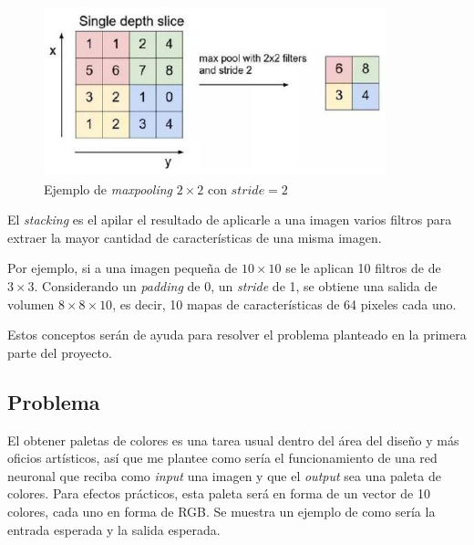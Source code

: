 \documentclass[14pt,a4paper]{report}
\begin{document}
\begin{figure}[h]
  \centering
\includegraphics[scale=1]{../maxpooling.png} 
  \caption{Ejemplo de \textit{maxpooling} $2\times2$ con $\textit{stride}=2$}
  \label{fig:neural-network}
\end{figure}

El \textit{stacking} es el apilar el resultado de aplicarle a una imagen varios filtros para extraer la mayor cantidad de características de una misma imagen. 

Por ejemplo, si a una imagen pequeña de $10 \times 10$ se le aplican 10 filtros de de $3 \times 3$. Considerando un \textit{padding} de 0, un \textit{stride} de 1, se obtiene una salida de volumen $8 \times 8 \times 10$, es decir, 10 mapas de características de 64 pixeles cada uno.

Estos conceptos serán de ayuda para resolver el problema planteado en la primera parte del proyecto.

\subsection*{Problema}

El obtener paletas de colores es una tarea usual dentro del área del diseño y más oficios artísticos, así que me plantee como sería el funcionamiento de una red neuronal que reciba como \textit{input} una imagen y que el \textit{output} sea una paleta de colores. Para efectos prácticos, esta paleta será en forma de un vector de 10 colores, cada uno en forma de RGB. Se muestra un ejemplo de como sería la entrada esperada y la salida esperada.
\end{document}
